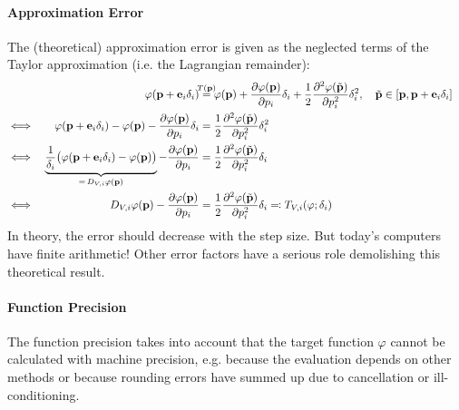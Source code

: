 				\paragraph{Approximation Error}
					The (theoretical) approximation error is given as the neglected terms of the Taylor approximation (i.e. the Lagrangian remainder):
					\begin{align*}
						&& \varphi(\vec{p} + \vec{e}_i \delta_i) &\overset{\mathclap{\,T(\vec{p})\,}}{=} \varphi(\vec{p}) + \pdv{\varphi(\vec{p})}{p_i} \delta_i + \frac{1}{2} \pdv[2]{\varphi(\tilde{\vec{p}})}{p_i} \delta_i^2,\quad \tilde{\vec{p}} \in [\vec{p}, \vec{p} + \vec{e}_i \delta_i] & \\
						\iff && \varphi(\vec{p} + \vec{e}_i \delta_i) - \varphi(\vec{p}) - \pdv{\varphi(\vec{p})}{p_i} \delta_i &= \frac{1}{2} \pdv[2]{\varphi(\tilde{\vec{p}})}{p_i} \delta_i^2 & \\
						\iff && \underbrace{\frac{1}{\delta_i} \big( \varphi(\vec{p} + \vec{e}_i \delta_i) - \varphi(\vec{p}) \big)}_{=\, D_{V, i}\varphi(\vec{p})} - \pdv{\varphi(\vec{p})}{p_i} &= \frac{1}{2} \pdv[2]{\varphi(\tilde{\vec{p}})}{p_i} \delta_i & \\
						\iff && D_{V, i}\varphi(\vec{p}) - \pdv{\varphi(\vec{p})}{p_i} &= \frac{1}{2} \pdv[2]{\varphi(\tilde{\vec{p}})}{p_i} \delta_i \eqqcolon T_{V, i}(\varphi; \delta_i) &
					\end{align*}
					In theory, the error should decrease with the step size. But today's computers have finite arithmetic! Other error factors have a serious role demolishing this theoretical result.

				\paragraph{Function Precision}
					The function precision takes into account that the target function \( \varphi \) cannot be calculated with machine precision, e.g. because the evaluation depends on other methods or because rounding errors have summed up due to cancellation or ill-conditioning.
					
